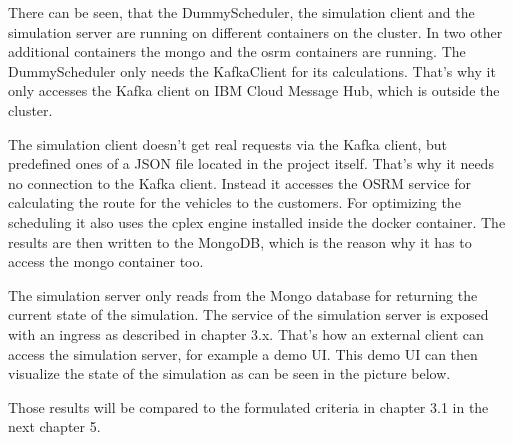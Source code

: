 
There can be seen, that the DummyScheduler, the simulation client and the simulation server are running on different containers on the cluster. In two other additional containers the mongo and the osrm containers are running. The DummyScheduler only needs the KafkaClient for its calculations. That's why it only accesses the Kafka client on IBM Cloud Message Hub, which is outside the cluster. 

The simulation client doesn't get real requests via the Kafka client, but predefined ones of a JSON file located in the project itself. That's why it needs no connection to the Kafka client. Instead it accesses the OSRM service for calculating the route for the vehicles to the customers. For optimizing the scheduling it also uses the cplex engine installed inside the docker container. The results are then written to the MongoDB, which is the reason why it has to access the mongo container too. 

The simulation server only reads from the Mongo database for returning the current state of the simulation. The service of the simulation server is exposed with an ingress as described in chapter 3.x. That's how an external client can access the simulation server, for example a demo UI. This demo UI can then visualize the state of the simulation as can be seen in the picture below.

Those results will be compared to the formulated criteria in chapter 3.1 in the next chapter 5.